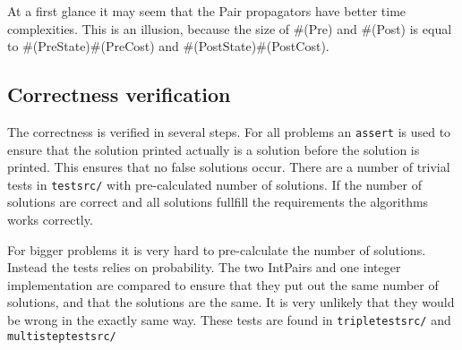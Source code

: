 \documentclass[a4paper,11pt]{article}
\begin{document}
At a first glance it may seem that the Pair propagators have better time complexities. This is an illusion, because the size of \#(Pre) and \#(Post) is equal to \#(PreState)\#(PreCost) and \#(PostState)\#(PostCost).

\subsection{Correctness verification}
The correctness is verified in several steps. For all problems an \texttt{assert} is used to ensure that the solution printed actually is a solution before the solution is printed. This ensures that no false solutions occur. There are a number of trivial tests in \texttt{testsrc/} with pre-calculated number of solutions. If the number of solutions are correct and all solutions fullfill the requirements the algorithms works correctly.

For bigger problems it is very hard to pre-calculate the number of solutions. Instead the tests relies on probability. The two IntPairs and one integer implementation are compared to ensure that they put out the same number of solutions, and that the solutions are the same. It is very unlikely that they would be wrong in the exactly same way. These tests are found in \texttt{tripletestsrc/} and \texttt{multisteptestsrc/}
\end{document}
